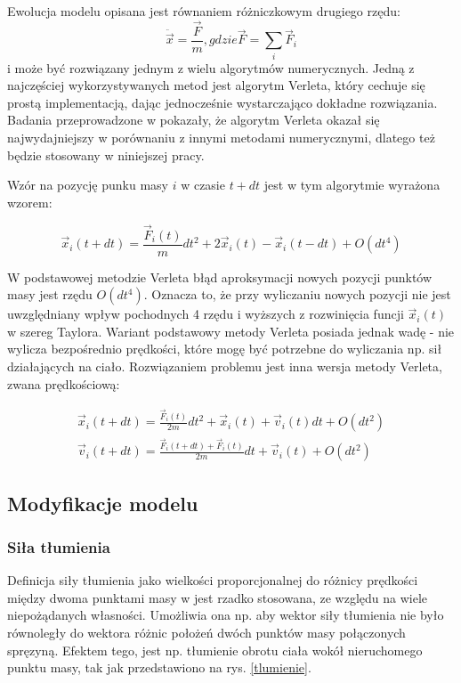 Ewolucja modelu opisana jest równaniem różniczkowym drugiego rzędu:
\begin{equation}
\ddot{\vec{x}} = \frac{\vec{F}}{m}, gdzie \vec{F} = \sum_i \vec{F}_i
\end{equation}
i może być rozwiązany jednym z wielu algorytmów numerycznych.
Jedną z najczęściej wykorzystywanych metod jest algorytm Verleta, który cechuje się prostą
implementacją, dając jednocześnie wystarczająco dokładne rozwiązania. Badania
przeprowadzone w \cite{var} pokazały, że algorytm Verleta okazał się
najwydajniejszy w porównaniu z innymi metodami numerycznymi, dlatego też będzie
stosowany w niniejszej pracy.

Wzór na pozycję punku masy $i$ w czasie $t + dt$ jest w tym algorytmie wyrażona wzorem:

\begin{equation}
\vec{x}_i(t + dt) = \frac{\vec{F}_i(t)}{m} dt^2 + 2\vec{x}_i(t) - \vec{x}_i(t -
		dt) + O(dt^4)
\end{equation}

W podstawowej metodzie Verleta błąd aproksymacji nowych pozycji punktów masy
jest rzędu $O(dt^4)$. Oznacza to, że przy wyliczaniu nowych pozycji nie jest
uwzględniany wpływ pochodnych 4 rzędu i wyższych z rozwinięcia funcji
$\vec{x}_i(t)$ w szereg Taylora. Wariant podstawowy metody Verleta posiada
 jednak wadę - nie wylicza bezpośrednio prędkości, które mogę być potrzebne do
 wyliczania np. sił działających na ciało. Rozwiązaniem problemu jest inna
 wersja metody Verleta, zwana prędkościową:

\begin{eqnarray}
\vec{x}_i(t + dt) = \frac{\vec{F}_i(t)}{2m} dt^2 + \vec{x}_i(t) + \vec{v}_i(t)dt
+ O(dt^2)\\
\vec{v}_i(t + dt) = \frac{\vec{F}_i(t + dt) + \vec{F}_i(t)}{2m}dt + \vec{v}_i(t)
+ O(dt^2)
\end{eqnarray}

%
%
\subsection{Modyfikacje modelu}

\subsubsection{Siła tłumienia}
Definicja siły tłumienia jako wielkości proporcjonalnej do różnicy prędkości między dwoma punktami masy w
jest rzadko stosowana, ze względu na wiele niepożądanych
własności. Umożliwia ona np. aby wektor siły tłumienia nie było równoległy do 
wektora różnic położeń dwóch punktów masy połączonych spręzyną.
Efektem tego, jest np. tłumienie obrotu ciała wokół nieruchomego punktu masy, tak jak
przedstawiono na rys. \ref{tlumienie}.

